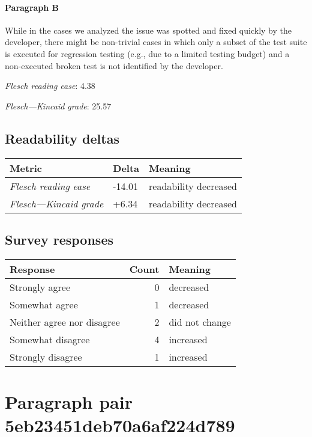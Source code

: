 \paragraph{Paragraph B}
While in the cases we analyzed the issue was spotted and fixed quickly by the developer, there might be non-trivial cases in which only a subset of the test suite is executed for regression testing (e.g., due to a limited testing budget) and a non-executed broken test is not identified by the developer.\par\medskip
\emph{Flesch reading ease}: 4.38\par
\emph{Flesch---Kincaid grade}: 25.57

\subsection{Readability deltas}

\begin{tabular}{lll}
\toprule
               \textbf{Metric} & \textbf{Delta} &       \textbf{Meaning} \\
\midrule
    \emph{Flesch reading ease} &         -14.01 &  readability decreased \\
 \emph{Flesch---Kincaid grade} &          +6.34 &  readability decreased \\
\bottomrule
\end{tabular}

\subsection{Survey responses}
\begin{tabular}{lrl}
\toprule
          \textbf{Response} &  \textbf{Count} & \textbf{Meaning} \\
\midrule
             Strongly agree &               0 &        decreased \\
             Somewhat agree &               1 &        decreased \\
 Neither agree nor disagree &               2 &   did not change \\
          Somewhat disagree &               4 &        increased \\
          Strongly disagree &               1 &        increased \\
\bottomrule
\end{tabular}

\section{Paragraph pair 5eb23451deb70a6af224d789}
